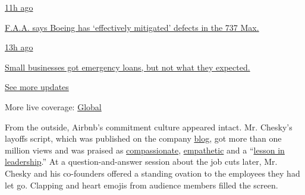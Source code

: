 \href{https://www.nytimes3xbfgragh.onion/live/2020/08/03/business/stock-market-today-coronavirus?action=click\&pgtype=Article\&state=default\&region=MAIN_CONTENT_1\&context=storylines_live_updates\#faa-says-boeing-has-effectively-mitigated-defects-in-the-737-max}{11h
ago}

\href{https://www.nytimes3xbfgragh.onion/live/2020/08/03/business/stock-market-today-coronavirus?action=click\&pgtype=Article\&state=default\&region=MAIN_CONTENT_1\&context=storylines_live_updates\#faa-says-boeing-has-effectively-mitigated-defects-in-the-737-max}{F.A.A.
says Boeing has `effectively mitigated' defects in the 737 Max.}

\href{https://www.nytimes3xbfgragh.onion/live/2020/08/03/business/stock-market-today-coronavirus?action=click\&pgtype=Article\&state=default\&region=MAIN_CONTENT_1\&context=storylines_live_updates\#small-businesses-got-emergency-loans-but-not-what-they-expected}{13h
ago}

\href{https://www.nytimes3xbfgragh.onion/live/2020/08/03/business/stock-market-today-coronavirus?action=click\&pgtype=Article\&state=default\&region=MAIN_CONTENT_1\&context=storylines_live_updates\#small-businesses-got-emergency-loans-but-not-what-they-expected}{Small
businesses got emergency loans, but not what they expected.}

\href{https://www.nytimes3xbfgragh.onion/live/2020/08/03/business/stock-market-today-coronavirus?action=click\&pgtype=Article\&state=default\&region=MAIN_CONTENT_1\&context=storylines_live_updates}{See
more updates}

More live coverage:
\href{https://www.nytimes3xbfgragh.onion/2020/08/03/world/coronavirus-covid-19.html?action=click\&pgtype=Article\&state=default\&region=MAIN_CONTENT_1\&context=storylines_live_updates}{Global}

From the outside, Airbnb's commitment culture appeared intact. Mr.
Chesky's layoffs script, which was published on the company
\href{https://news.airbnb.com/a-message-from-co-founder-and-ceo-brian-chesky/}{blog},
got more than one million views and was praised as
\href{https://www.businessinsider.com/airbnb-ceo-brian-chesky-layoffs-show-respect-compassion-for-employees-2020-5}{compassionate},
\href{https://www.prnewsonline.com/airbnb-ceo-delivers-empathetic-transparent-message-regarding-layoffs/}{empathetic}
and a
``\href{https://www.inc.com/jason-aten/lessons-behind-airbnb-ceos-email-about-laying-off-1900-workers.html}{lesson
in leadership}.'' At a question-and-answer session about the job cuts
later, Mr. Chesky and his co-founders offered a standing ovation to the
employees they had let go. Clapping and heart emojis from audience
members filled the screen.

